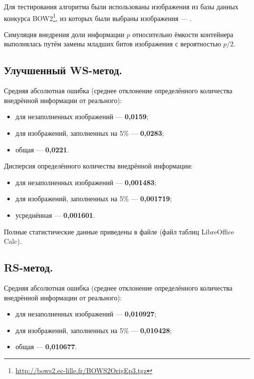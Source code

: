 \documentclass[12pt,a4paper,russian,numbers=endperiod]{scrartcl}
\begin{document}
Для тестирования алгоритма были использованы изображения из базы данных конкурса BOW2\footnote{\url{http://bows2.ec-lille.fr/BOWS2OrigEp3.tgz}}, из которых были выбраны изображения  --- .

Симуляция внедрения доли информации $p$ относительно ёмкости контейнера выполнялась путём замены младших битов изображения с вероятностью $p/2$.

\subsection{Улучшенный WS-метод.}

Средняя абсолютная ошибка (среднее отклонение определённого количества внедрённой информации от реального):
\begin{itemize}
	\item для незаполненных изображений --- \textbf{0,0159};
	\item для изображений, заполненных на 5\% --- \textbf{0,0283};
	\item общая --- \textbf{0,0221}.
\end{itemize}

Дисперсия определённого количества внедрённой информации:

\begin{itemize}
	\item для незаполненных изображений --- \textbf{0,001483};
	\item для изображений, заполненных на 5\% --- \textbf{0,001719};
	\item усреднённая --- \textbf{0,001601}.
\end{itemize}

Полные статистические данные приведены в файле  (файл таблиц LibreOffice Calc).

\subsection{RS-метод.}

Средняя абсолютная ошибка (среднее отклонение определённого количества внедрённой информации от реального):

\begin{itemize}
	\item для незаполненных изображений --- \textbf{0,010927};
	\item для изображений, заполненных на 5\% --- \textbf{0,010428};
	\item общая --- \textbf{0,010677}.
\end{itemize}
\end{document}
